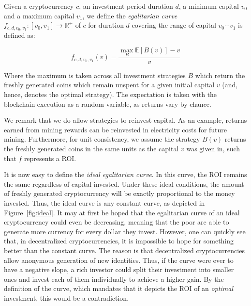 \begin{definition}
  Given a cryptocurrency $c$, an investment period duration $d$, a minimum
  capital $v_0$ and a maximum capital $v_1$, we define the
  \emph{egalitarian curve}
  $f_{c,d,v_0,v_1}: [v_0, v_1] \longrightarrow \mathbb{R}^+$ of $c$ for
  duration $d$ covering the range of capital $v_0 \cdots v_1$ is defined as:

  \[
  f_{c,d,v_0,v_1}(v) = \frac{\max_B{\mathbb{E}[B(v)]} - v}{v}
  \]

  Where the maximum is taken across all investment strategies $B$ which return
  the freshly generated coins which remain unspent for a given initial capital
  $v$ (and, hence, denotes the optimal strategy). The expectation is taken with
  the blockchain execution as a random variable, as returns vary by chance.
\end{definition}

We remark that we do allow strategies to reinvest capital. As an example,
returns earned from mining rewards can be reinvested in electricity costs for
future mining. Furthermore, for unit consistency, we assume the strategy $B(v)$
returns the freshly generated coins in the same units as the capital $v$ was
given in, such that $f$ represents a ROI.

It is now easy to define the \emph{ideal egalitarian curve}. In this curve, the
ROI remains the same regardless of capital invested. Under these ideal
conditions, the amount of freshly generated cryptocurrency will be exactly
proportional to the money invested. Thus, the ideal curve is any constant curve,
as depicted in Figure~\ref{fig:ideal}. It may at first be hoped that the
egalitarian curve of an ideal cryptocurrency could even be decreasing, meaning
that the poor are able to generate more currency for every dollar they invest.
However, one can quickly see that, in decentralized cryptocurrencies, it is
impossible to hope for something better than the constant curve. The reason is
that decentralized cryptocurrencies allow anonymous generation of new
identities. Thus, if the curve were ever to have a negative slope, a rich
investor could split their investment into smaller ones and invest each of them
individually to achieve a higher gain. By the definition of the curve, which
mandates that it depicts the ROI of an \emph{optimal} investment, this would be
a contradiction.

